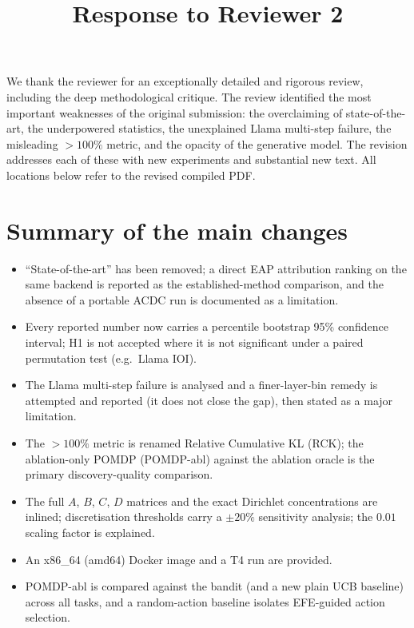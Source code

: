 \documentclass[11pt]{article}
\title{\vspace{-1.5em}Response to Reviewer 2}
\author{}
\date{}
\begin{document}
\maketitle
\vspace{-3em}

\noindent We thank the reviewer for an exceptionally detailed and rigorous
review, including the deep methodological critique. The review identified the
most important weaknesses of the original submission: the overclaiming of
state-of-the-art, the underpowered statistics, the unexplained Llama multi-step
failure, the misleading $>100\%$ metric, and the opacity of the generative model.
The revision addresses each of these with new experiments and substantial new
text. All locations below refer to the revised compiled PDF.

\section*{Summary of the main changes}
\begin{itemize}[leftmargin=1.4em,itemsep=2pt]
  \item ``State-of-the-art'' has been removed; a direct EAP attribution ranking
        on the same backend is reported as the established-method comparison, and
        the absence of a portable ACDC run is documented as a limitation.
  \item Every reported number now carries a percentile bootstrap 95\% confidence
        interval; H1 is not accepted where it is not significant under a paired
        permutation test (e.g.\ Llama IOI).
  \item The Llama multi-step failure is analysed and a finer-layer-bin remedy is
        attempted and reported (it does not close the gap), then stated as a major
        limitation.
  \item The $>100\%$ metric is renamed Relative Cumulative KL (RCK); the
        ablation-only POMDP (POMDP-abl) against the ablation oracle is the primary
        discovery-quality comparison.
  \item The full $A$, $B$, $C$, $D$ matrices and the exact Dirichlet
        concentrations are inlined; discretisation thresholds carry a $\pm20\%$
        sensitivity analysis; the $0.01$ scaling factor is explained.
  \item An x86\_64 (amd64) Docker image and a T4 run are provided.
  \item POMDP-abl is compared against the bandit (and a new plain UCB baseline)
        across all tasks, and a random-action baseline isolates EFE-guided action
        selection.
\end{itemize}
\end{document}
